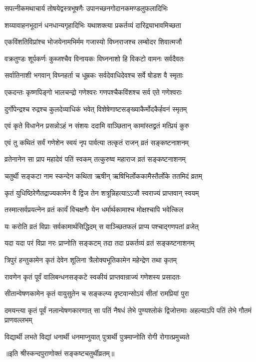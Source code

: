 \twolineshloka
{सपत्नीकमथाचार्य तोषयेद्वस्त्रभूषणैः}
{उपानच्छनगोदानकमण्डलुफलादिभिः} %


\twolineshloka
{शय्यावाहनभूदानं धनधान्यगृहादिभिः}
{यथाशक्त्या प्रकर्तव्यं दारिद्र्याभावमिच्छता} %


\twolineshloka
{एकविंशतिविप्रांश्च भोजयेनामभिर्मम}
{गजास्यो विघ्नराजश्च लम्बोदर शिवात्मजौ} %


\twolineshloka
{वक्रतुण्डः शूर्पकर्णः कुब्जश्चैव विनायकः}
{विघ्ननाशो हि विकटो वामनः सर्वदैवतः} %


\twolineshloka
{सर्वातिनाशी भगवान् विघ्नहर्ता च धूम्रकः}
{सर्वदेवाधिदेवश्च सर्वे षोडश वै स्मृताः} %


\twolineshloka
{एकदन्तः कृष्णपिङ्गो भालचन्द्रो गणेश्वरः}
{गणपश्चैकविंशश्च सर्व एते गणेश्वराः} %

\twolineshloka
{दुर्गोपेन्द्रश्च रुद्रश्च कुलदेव्याधिकं भवेत्}
{विशेषेणाष्टसङ्ख्याकैर्मोदकैर्हवनं स्मृतम्} %


\twolineshloka
{एवं कृते विधानेन प्रसन्नोऽहं न संशयः}
{ददामि वाञ्छितान् कामांस्तद्व्रतं मत्प्रियं कुरु} %


\twolineshloka
{एवं तु कथितं सर्वं गणेशेन स्वयं नृप}
{पार्वत्या तत्कृतं राजन् व्रतं सङ्कष्टनाशनम्} %


\twolineshloka
{व्रतेनानेन सा प्राप महादेवं पतिं स्वकम्}
{तत्कुरुष्व महाराज व्रतं सङ्कष्टनाशनम्} %


\twolineshloka
{चतुर्थी सङ्कटा नाम स्कन्देन कथिता ऋषीन्}
{ऋषिभिर्लोककामैस्तैर्लोके ततमिदं व्रतम्} %


\twolineshloka
{कृतं युधिष्ठिरेणैतद्राज्यकामेन वै द्विज}
{तेन शत्रून्निहत्याऽऽजौ स्वराज्यं प्राप्तवान् स्वयम्} %


\twolineshloka
{तस्मात्सर्वप्रयत्नेन व्रतं कार्यं विचक्षणैः}
{येन धर्मार्थकामाश्च मोक्षश्चापि भवेत्किल} %


\twolineshloka
{यः करोति व्रतं विप्राः सर्वकामार्थसिद्धिदम्}
{स वाञ्च्छितफलं प्राप्य पश्चाद्गणपतां व्रजेत्} %


\twolineshloka
{यदा यदा परं विप्रा नरः प्राप्नोति सङ्कटम्}
{तदा तदा प्रकर्तव्यं व्रतं सङ्कष्टनाशनम्} %


\twolineshloka
{त्रिपुरं हन्तुकामेन कृतं देवेन शूलिना}
{त्रैलोक्यभूतिकामेन महेन्द्रेण तथा कृतम्} %


\twolineshloka
{रावणेन कृतं पूर्वं वालिबन्धनसङ्कटे}
{स्वकीयं प्राप्तवान्राज्यं गणेशस्य प्रसादतः} %


\twolineshloka
{सीतान्वेषणकामेन कृतं वायुसुतेन च}
{सङ्कल्प्य दृष्टवान्सोऽयं सीतां रामप्रियां पुरा} %


\threelineshloka
{दमयन्त्या कृतं पूर्वं नलान्वेषणकारणात्}
{सा पतिं नैषधं लेभे पुण्यश्लोकं द्विजोत्तमाः}
{अहल्याऽपि पतिं लेभे गौतमं प्राणवल्लभम्} %

\twolineshloka
{विद्यार्थी लभते विद्यां धनार्थी धनमाप्नुयात्}
{पुत्रार्थी पुत्रमाप्नोति रोगी रोगात्प्रमुच्यते} %

\centerline{॥इति श्रीस्कन्दपुराणोक्तं सङ्कष्टचतुर्थीव्रतम्॥} %



